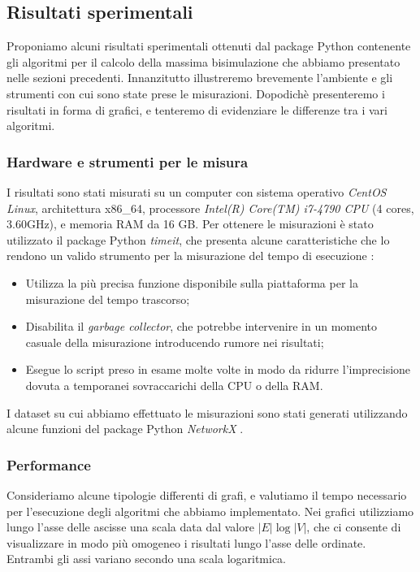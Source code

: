 \subsection{Risultati sperimentali}
Proponiamo alcuni risultati sperimentali ottenuti dal package Python contenente gli algoritmi per il calcolo della massima bisimulazione che abbiamo presentato nelle sezioni precedenti. Innanzitutto illustreremo brevemente l'ambiente e gli strumenti con cui sono state prese le misurazioni. Dopodichè presenteremo i risultati in forma di grafici, e tenteremo di evidenziare le differenze tra i vari algoritmi.

\subsubsection{Hardware e strumenti per le misura}
I risultati sono stati misurati su un computer con sistema operativo \emph{CentOS Linux}, architettura x86\_64, processore \emph{Intel(R) Core(TM) i7-4790 CPU} (4 cores, 3.60GHz), e memoria RAM da 16 GB. Per ottenere le misurazioni è stato utilizzato il package Python \emph{timeit}, che presenta alcune caratteristiche che lo rendono un valido strumento per la misurazione del tempo di esecuzione \cite{pythondocs}:
\begin{itemize}
    \item Utilizza la più precisa funzione disponibile sulla piattaforma per la misurazione del tempo trascorso;
    \item Disabilita il \emph{garbage collector}, che potrebbe intervenire in un momento casuale della misurazione introducendo rumore nei risultati;
    \item Esegue lo script preso in esame molte volte in modo da ridurre l'imprecisione dovuta a temporanei sovraccarichi della CPU o della RAM.
\end{itemize}

I dataset su cui abbiamo effettuato le misurazioni sono stati generati utilizzando alcune funzioni del package Python \emph{NetworkX} \cite{networkx}.

\subsubsection{Performance}
Consideriamo alcune tipologie differenti di grafi, e valutiamo il tempo necessario per l'esecuzione degli algoritmi che abbiamo implementato. Nei grafici utilizziamo lungo l'asse delle ascisse una scala data dal valore $|E| \log |V|$, che ci consente di visualizzare in modo più omogeneo i risultati lungo l'asse delle ordinate. Entrambi gli assi variano secondo una scala logaritmica.

